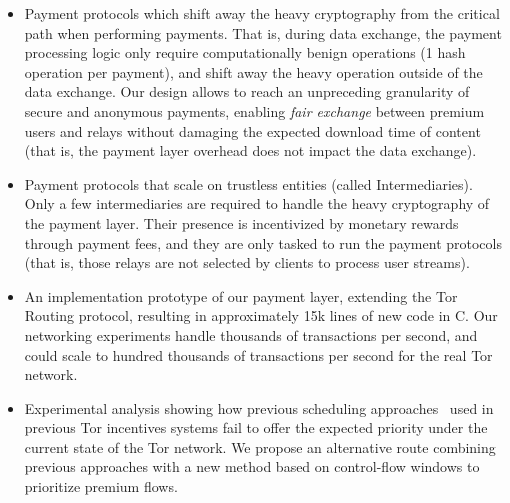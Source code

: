  \begin{itemize}
 	\item Payment protocols which shift away the heavy cryptography from the
          critical path when performing payments. That is, during data exchange,
          the payment processing logic only require computationally benign
          operations (1 hash operation per payment), and shift away the heavy
          operation outside of the data exchange. Our design allows to reach an
          unpreceding granularity of secure and anonymous payments, enabling
          \textit{fair exchange} between premium users and relays without
          damaging the expected download time of content (that is, the payment
          layer overhead does not impact the data exchange).

 	\item Payment protocols that scale on trustless entities (called
          Intermediaries). Only a few intermediaries are required to handle the
          heavy cryptography of the payment layer. Their presence is
          incentivized by monetary rewards through payment fees, and they are
          only tasked to run the payment protocols (that is, those relays are
          not selected by clients to process user streams).
 	
 	\item An implementation prototype of our payment layer, extending the
          Tor Routing protocol, resulting in approximately 15k lines of new code
          in C. Our networking experiments handle thousands of transactions per
          second, and could scale to hundred thousands of transactions per
          second for the real Tor network.
 	
 	\item Experimental analysis showing how previous scheduling
          approaches~\cite{dovrolis1999case, tang2010improved} used in previous
          Tor incentives systems fail to offer the expected priority under the
          current state of the Tor network. We propose an alternative route
          combining previous approaches with a new method based on control-flow
          windows to prioritize premium flows.
 \end{itemize}
 

